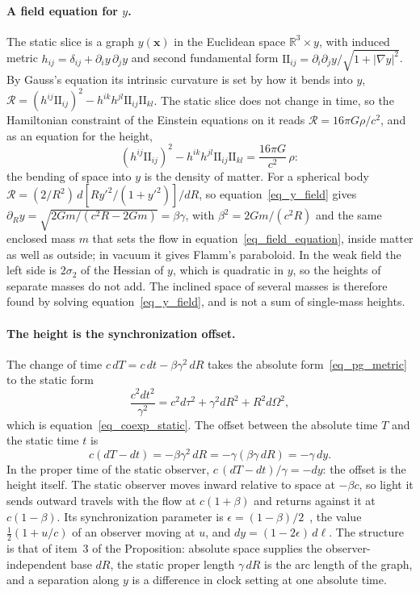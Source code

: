 \documentclass{iopjournal}
\begin{document}
\paragraph{A field equation for $y$.} The static slice is a graph $y(\mathbf{x})$ in the Euclidean space $\mathbb{R}^3\times y$, with induced metric $h_{ij}=\delta_{ij}+\partial_iy\,\partial_jy$ and second fundamental form $\mathrm{II}_{ij}=\partial_i\partial_jy/\sqrt{1+|\nabla y|^2}$. By Gauss's equation its intrinsic curvature is set by how it bends into $y$, $\mathcal{R}=(h^{ij}\mathrm{II}_{ij})^2-h^{ik}h^{jl}\mathrm{II}_{ij}\mathrm{II}_{kl}$. The static slice does not change in time, so the Hamiltonian constraint of the Einstein equations on it reads $\mathcal{R}=16\pi G\rho/c^2$, and as an equation for the height,
\begin{equation}\label{eq_y_field}
    \left(h^{ij}\mathrm{II}_{ij}\right)^2-h^{ik}h^{jl}\mathrm{II}_{ij}\mathrm{II}_{kl}=\frac{16\pi G}{c^2}\,\rho :
\end{equation}
the bending of space into $y$ is the density of matter. For a spherical body $\mathcal{R}=(2/R^2)\,d[Ry'^2/(1+y'^2)]/dR$, so equation~\eqref{eq_y_field} gives $\partial_Ry=\sqrt{2Gm/(c^2R-2Gm)}=\beta\gamma$, with $\beta^2=2Gm/(c^2R)$ and the same enclosed mass $m$ that sets the flow in equation~\eqref{eq_field_equation}, inside matter as well as outside; in vacuum it gives Flamm's paraboloid. In the weak field the left side is $2\sigma_2$ of the Hessian of $y$, which is quadratic in $y$, so the heights of separate masses do not add. The inclined space of several masses is therefore found by solving equation~\eqref{eq_y_field}, and is not a sum of single-mass heights.

\paragraph{The height is the synchronization offset.} The change of time $c\,dT=c\,dt-\beta\gamma^2\,dR$ takes the absolute form~\eqref{eq_pg_metric} to the static form
\begin{equation}\label{eq_static_form}
    \frac{c^2dt^2}{\gamma^2}=c^2d\tau^2+\gamma^2dR^2+R^2d\Omega^2 ,
\end{equation}
which is equation~\eqref{eq_coexp_static}. The offset between the absolute time $T$ and the static time $t$ is
\begin{equation}\label{eq_sync_gap_flamm}
    c\left(dT-dt\right)=-\beta\gamma^2\,dR=-\gamma\left(\beta\gamma\,dR\right)=-\gamma\,dy .
\end{equation}
In the proper time of the static observer, $c\,(dT-dt)/\gamma=-dy$: the offset is the height itself. The static observer moves inward relative to space at $-\beta c$, so light it sends outward travels with the flow at $c(1+\beta)$ and returns against it at $c(1-\beta)$. Its synchronization parameter is $\epsilon=(1-\beta)/2$~\cite{Reichenbach1958}, the value $\tfrac12(1+u/c)$ of an observer moving at $u$, and $dy=(1-2\epsilon)\,d\ell$. The structure is that of item~3 of the Proposition: absolute space supplies the observer-independent base $dR$, the static proper length $\gamma\,dR$ is the arc length of the graph, and a separation along $y$ is a difference in clock setting at one absolute time.
\end{document}
